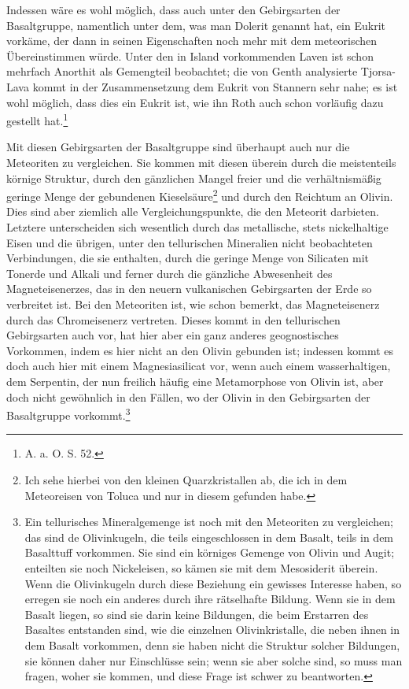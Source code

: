 \documentclass[a4paper, 11pt, oneside]{article}
\begin{document}
Indessen wäre es wohl möglich, dass auch unter den Gebirgsarten der Basaltgruppe, namentlich unter dem, was man Dolerit genannt hat, ein Eukrit vorkäme, der dann in seinen Eigenschaften noch mehr mit dem meteorischen Übereinstimmen würde. Unter den in Island vorkommenden Laven ist schon mehrfach Anorthit als Gemengteil beobachtet; die von Genth analysierte Tjorsa-Lava kommt in der Zusammensetzung dem Eukrit von Stannern sehr nahe; es ist wohl möglich, dass dies ein Eukrit ist, wie ihn Roth auch schon vorläufig dazu gestellt hat.\footnote{A. a. O. S. 52.}

Mit diesen Gebirgsarten der Basaltgruppe sind überhaupt auch nur die Meteoriten zu vergleichen. Sie kommen mit diesen überein durch die meistenteils körnige Struktur, durch den gänzlichen Mangel freier und die verhältnismäßig geringe Menge der gebundenen Kieselsäure\footnote{Ich sehe hierbei von den kleinen Quarzkristallen ab, die ich in dem Meteoreisen von Toluca und nur in diesem gefunden habe.} und durch den Reichtum an Olivin. Dies sind aber ziemlich alle Vergleichungspunkte, die den Meteorit darbieten. Letztere unterscheiden sich wesentlich durch das metallische, stets nickelhaltige Eisen und die übrigen, unter den tellurischen Mineralien nicht beobachteten Verbindungen, die sie enthalten, durch die geringe Menge von Silicaten mit Tonerde und Alkali und ferner durch die gänzliche Abwesenheit des Magneteisenerzes, das in den neuern vulkanischen Gebirgsarten der Erde so verbreitet ist. Bei den Meteoriten ist, wie schon bemerkt, das Magneteisenerz durch das Chromeisenerz vertreten. Dieses kommt in den tellurischen Gebirgsarten auch vor, hat hier aber ein ganz anderes geognostisches Vorkommen, indem es hier nicht an den Olivin gebunden ist; indessen kommt es doch auch hier mit einem Magnesiasilicat vor, wenn auch einem wasserhaltigen, dem Serpentin, der nun freilich häufig eine Metamorphose von Olivin ist, aber doch nicht gewöhnlich in den Fällen, wo der Olivin in den Gebirgsarten der Basaltgruppe vorkommt.\footnote{Ein tellurisches Mineralgemenge ist noch mit den Meteoriten zu vergleichen; das sind de Olivinkugeln, die teils eingeschlossen in dem Basalt, teils in dem Basalttuff vorkommen. Sie sind ein körniges Gemenge von Olivin und Augit; enteilten sie noch Nickeleisen, so kämen sie mit dem Mesosiderit überein. Wenn die Olivinkugeln durch diese Beziehung ein gewisses Interesse haben, so erregen sie noch ein anderes durch ihre rätselhafte Bildung. Wenn sie in dem Basalt liegen, so sind sie darin keine Bildungen, die beim Erstarren des Basaltes entstanden sind, wie die einzelnen Olivinkristalle, die neben ihnen in dem Basalt vorkommen, denn sie haben nicht die Struktur solcher Bildungen, sie können daher nur Einschlüsse sein; wenn sie aber solche sind, so muss man fragen, woher sie kommen, und diese Frage ist schwer zu beantworten.}
\end{document}
